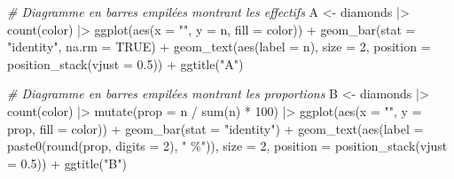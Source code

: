\documentclass[
]{book}
\newenvironment{Shaded}{\begin{snugshade}}{\end{snugshade}}
\newcommand{\AttributeTok}[1]{\textcolor[rgb]{0.77,0.63,0.00}{#1}}
\newcommand{\CommentTok}[1]{\textcolor[rgb]{0.56,0.35,0.01}{\textit{#1}}}
\newcommand{\ConstantTok}[1]{\textcolor[rgb]{0.00,0.00,0.00}{#1}}
\newcommand{\DecValTok}[1]{\textcolor[rgb]{0.00,0.00,0.81}{#1}}
\newcommand{\FloatTok}[1]{\textcolor[rgb]{0.00,0.00,0.81}{#1}}
\newcommand{\FunctionTok}[1]{\textcolor[rgb]{0.00,0.00,0.00}{#1}}
\newcommand{\NormalTok}[1]{#1}
\newcommand{\OtherTok}[1]{\textcolor[rgb]{0.56,0.35,0.01}{#1}}
\newcommand{\SpecialCharTok}[1]{\textcolor[rgb]{0.00,0.00,0.00}{#1}}
\newcommand{\StringTok}[1]{\textcolor[rgb]{0.31,0.60,0.02}{#1}}
\begin{document}
\begin{Shaded}
\begin{Highlighting}[]
\CommentTok{\# Diagramme en barres empilées montrant les effectifs}
\NormalTok{A }\OtherTok{\textless{}{-}}
\NormalTok{  diamonds }\SpecialCharTok{|\textgreater{}}
  \FunctionTok{count}\NormalTok{(color) }\SpecialCharTok{|\textgreater{}}
  \FunctionTok{ggplot}\NormalTok{(}\FunctionTok{aes}\NormalTok{(}\AttributeTok{x =} \StringTok{""}\NormalTok{, }\AttributeTok{y =}\NormalTok{ n, }\AttributeTok{fill =}\NormalTok{ color)) }\SpecialCharTok{+}
  \FunctionTok{geom\_bar}\NormalTok{(}\AttributeTok{stat =} \StringTok{"identity"}\NormalTok{, }\AttributeTok{na.rm =} \ConstantTok{TRUE}\NormalTok{) }\SpecialCharTok{+}
  \FunctionTok{geom\_text}\NormalTok{(}\FunctionTok{aes}\NormalTok{(}\AttributeTok{label =}\NormalTok{ n),}
            \AttributeTok{size =} \DecValTok{2}\NormalTok{,}
            \AttributeTok{position =} \FunctionTok{position\_stack}\NormalTok{(}\AttributeTok{vjust =} \FloatTok{0.5}\NormalTok{)) }\SpecialCharTok{+}
  \FunctionTok{ggtitle}\NormalTok{(}\StringTok{"A"}\NormalTok{)}

\CommentTok{\# Diagramme en barres empilées montrant les proportions}
\NormalTok{B }\OtherTok{\textless{}{-}}
\NormalTok{  diamonds }\SpecialCharTok{|\textgreater{}}
  \FunctionTok{count}\NormalTok{(color) }\SpecialCharTok{|\textgreater{}}
  \FunctionTok{mutate}\NormalTok{(}\AttributeTok{prop =}\NormalTok{ n }\SpecialCharTok{/} \FunctionTok{sum}\NormalTok{(n) }\SpecialCharTok{*} \DecValTok{100}\NormalTok{) }\SpecialCharTok{|\textgreater{}}
  \FunctionTok{ggplot}\NormalTok{(}\FunctionTok{aes}\NormalTok{(}\AttributeTok{x =} \StringTok{""}\NormalTok{, }\AttributeTok{y =}\NormalTok{ prop, }\AttributeTok{fill =}\NormalTok{ color)) }\SpecialCharTok{+}
  \FunctionTok{geom\_bar}\NormalTok{(}\AttributeTok{stat =} \StringTok{"identity"}\NormalTok{) }\SpecialCharTok{+}
  \FunctionTok{geom\_text}\NormalTok{(}\FunctionTok{aes}\NormalTok{(}\AttributeTok{label =} \FunctionTok{paste0}\NormalTok{(}\FunctionTok{round}\NormalTok{(prop, }\AttributeTok{digits =} \DecValTok{2}\NormalTok{), }\StringTok{" \%"}\NormalTok{)),}
            \AttributeTok{size =} \DecValTok{2}\NormalTok{,}
            \AttributeTok{position =} \FunctionTok{position\_stack}\NormalTok{(}\AttributeTok{vjust =} \FloatTok{0.5}\NormalTok{)) }\SpecialCharTok{+}
  \FunctionTok{ggtitle}\NormalTok{(}\StringTok{"B"}\NormalTok{)}


\end{Highlighting}
\end{Shaded}
\end{document}

